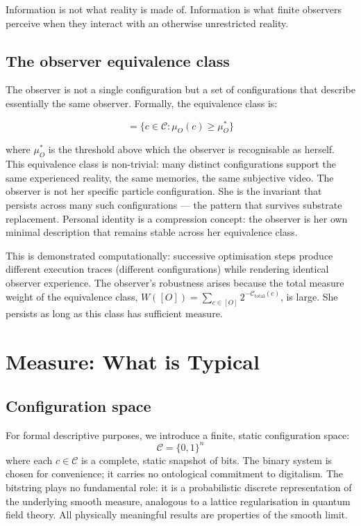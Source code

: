 \documentclass[12pt,a4paper]{article}
\newcommand{\Ctotal}{\mathcal{C}_{\mathrm{total}}}
\newcommand{\muO}{\mu_O}
\begin{document}
Information is not what reality is made of. Information is what finite
observers perceive when they interact with an otherwise unrestricted reality.

\subsection*{The observer equivalence class}

The observer is not a single configuration but a set of configurations that
describe essentially the same observer. Formally, the equivalence class is:

\begin{equation}
[O] = \{ c \in \mathcal{C} : \muO(c) \geq \muO^* \}
\end{equation}

where $\muO^*$ is the threshold above which the observer is recognisable as
herself. This equivalence class is non-trivial: many distinct configurations
support the same experienced reality, the same memories, the same subjective
video. The observer is not her specific particle configuration. She is the
invariant that persists across many such configurations --- the pattern that
survives substrate replacement. Personal identity is a compression concept:
the observer is her own minimal description that remains stable across her
equivalence class.

This is demonstrated computationally: successive optimisation steps produce
different execution traces (different configurations) while
rendering identical observer experience. The observer's robustness arises
because the total measure weight of the equivalence class,
$W([O]) = \sum_{c \in [O]} 2^{-\Ctotal(c)}$,
is large. She persists as long as this class has sufficient measure.

\section{Measure: What is Typical}
\label{sec:measure}

\subsection*{Configuration space}

For formal descriptive purposes, we introduce a finite, static configuration
space:
\begin{equation}
\mathcal{C} = \{0,1\}^n
\end{equation}
where each $c \in \mathcal{C}$ is a complete, static snapshot of bits. The
binary system is chosen for convenience; it carries no ontological commitment
to digitalism. The bitstring plays no fundamental role: it is a probabilistic
discrete representation of the underlying smooth measure, analogous to a
lattice regularisation in quantum field theory. All physically meaningful
results are properties of the smooth limit.
\end{document}

